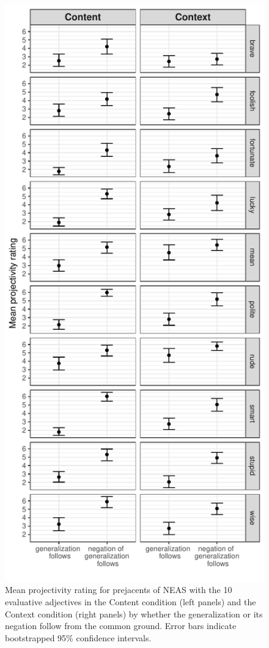\documentclass[11pt,fleqn]{article}
\newcommand{\6}{\mbox{$[\hspace*{-.6mm}[$}}
\newcommand{\9}{\mbox{$]\hspace*{-.6mm}]$}}
\begin{document}
\begin{figure}[H]
\begin{center}
\includegraphics[scale=.7]{../exp2-projection/graphs/targetmeans-by-condition-and-adj}

\caption{Mean projectivity rating for prejacents of NEAS with the 10 evaluative adjectives in the Content condition (left panels) and the Context condition (right panels) by whether the generalization or its negation follow from the common ground. Error bars indicate bootstrapped 95\% confidence intervals.}\label{f-condis}
\end{center}
\end{figure}
\end{document}
